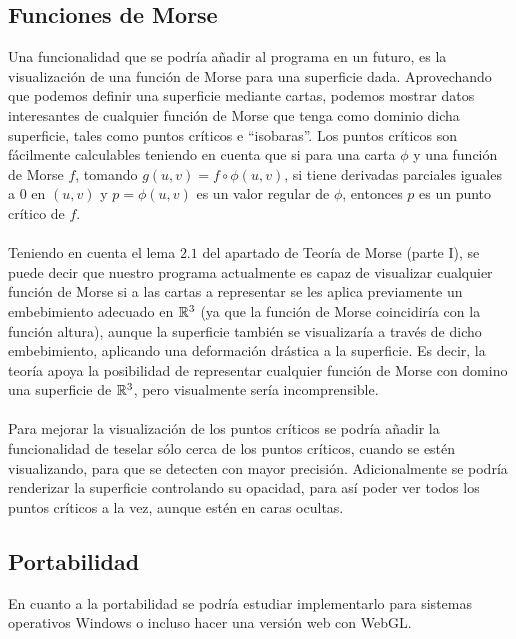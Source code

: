 \subsection*{Funciones de Morse}
Una funcionalidad que se podría añadir al programa en un futuro, es la visualización de una función de Morse para una superficie dada. Aprovechando que podemos definir una superficie mediante cartas, podemos mostrar datos interesantes de cualquier función de Morse que tenga como dominio dicha superficie, tales como puntos críticos e ``isobaras''. Los puntos críticos son fácilmente calculables teniendo en cuenta que si para una carta $\phi$ y una función de Morse $f$, tomando $g(u,v)=f \circ \phi (u,v)$, si tiene derivadas parciales iguales a $0$ en $(u, v)$ y $p=\phi(u,v)$ es un valor regular de $\phi$, entonces $p$ es un punto crítico de $f$.\\
\\Teniendo en cuenta el lema $2.1$ del apartado de Teoría de Morse (parte I), se puede decir que nuestro programa actualmente es capaz de visualizar cualquier función de Morse si a las cartas a representar se les aplica previamente un embebimiento adecuado en $\mathbb{R}^3$ (ya que la función de Morse coincidiría con la función altura), aunque la superficie también se visualizaría a través de dicho embebimiento, aplicando una deformación drástica a la superficie. Es decir, la teoría apoya la posibilidad de representar cualquier función de Morse con domino una superficie de $\mathbb{R}^3$, pero visualmente sería incomprensible.\\
\\Para mejorar la visualización de los puntos críticos se podría añadir la funcionalidad de teselar sólo cerca de los puntos críticos, cuando se estén visualizando, para que se detecten con mayor precisión. Adicionalmente se podría renderizar la superficie controlando su opacidad, para así poder ver todos los puntos críticos a la vez, aunque estén en caras ocultas.

\subsection*{Portabilidad}
En cuanto a la portabilidad se podría estudiar implementarlo para sistemas operativos Windows o incluso hacer una versión web con WebGL.\\

